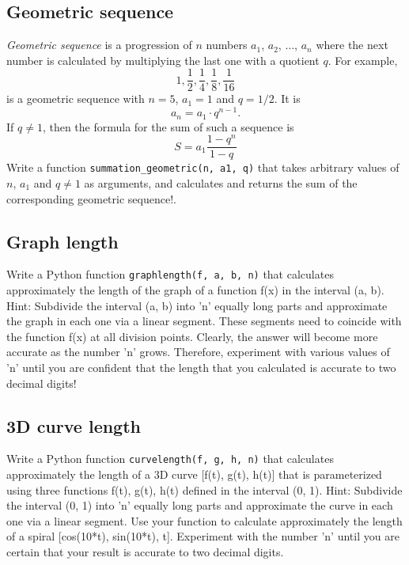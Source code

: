 
\subsection{Geometric sequence}

{\em Geometric sequence} is a progression of $n$ numbers $a_1$, $a_2$, $\ldots$, $a_n$
where the next number is calculated by multiplying the last one with a quotient $q$.
For example, 
$$
1, \frac{1}{2}, \frac{1}{4}, \frac{1}{8}, \frac{1}{16}
$$
is a geometric sequence with $n = 5$, $a_1 = 1$ and $q = 1/2$. It is 
$$
a_n = a_1 \cdot q^{n-1}.
$$
If $q \not = 1$, then the formula for the sum of such a sequence is
$$
S = a_1\frac{1 - q^n}{1 - q}
$$
Write a function {\tt summation\_geometric(n, a1, q)} that takes arbitrary 
values of $n$, $a_1$ and $q \not = 1$ as arguments, and calculates 
and returns the sum of the corresponding geometric sequence!.


\subsection{Graph length}

Write a Python function {\tt graphlength(f, a, b, n)} that calculates approximately 
the length of the graph of a function f(x) in the interval (a, b). Hint: Subdivide the 
interval (a, b) into 'n' equally long parts and approximate the graph in each one via 
a linear segment. These segments need to coincide with the function f(x) at all division 
points. Clearly, the answer will become more accurate as the number 'n' grows. Therefore, 
experiment with various values of 'n' until you are confident that the length that you 
calculated is accurate to two decimal digits!


\subsection{3D curve length}

Write a Python function {\tt curvelength(f, g, h, n)} that calculates approximately 
the length of a 3D curve [f(t), g(t), h(t)] that is parameterized using three functions 
f(t), g(t), h(t) defined in the interval (0, 1). Hint: Subdivide the 
interval (0, 1) into 'n' equally long parts and approximate the curve in each one via 
a linear segment. Use your function to calculate approximately the length 
of a spiral [cos(10*t), sin(10*t), t]. Experiment with the number 'n' until you 
are certain that your result is accurate to two decimal digits.

